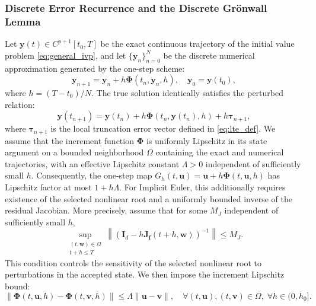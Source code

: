 \subsubsection{Discrete Error Recurrence and the Discrete Gr\"onwall Lemma}
Let $\mathbf{y}(t) \in C^{p+1}[t_0, T]$ be the exact continuous trajectory of the initial value problem \eqref{eq:general_ivp}, and let $\{\mathbf{y}_n\}_{n=0}^N$ be the discrete numerical approximation generated by the one-step scheme:
\begin{equation}
\label{eq:increment_form_convergence}
\mathbf{y}_{n+1} = \mathbf{y}_n + h \mathbf{\Phi}(t_n, \mathbf{y}_n, h), \quad \mathbf{y}_0 = \mathbf{y}(t_0),
\end{equation}
where $h = (T - t_0)/N$. The true solution identically satisfies the perturbed relation:
\begin{equation}
\label{eq:exact_perturbed_relation}
\mathbf{y}(t_{n+1}) = \mathbf{y}(t_n) + h \mathbf{\Phi}(t_n, \mathbf{y}(t_n), h) + h \boldsymbol{\tau}_{n+1},
\end{equation}
where $\boldsymbol{\tau}_{n+1}$ is the local truncation error vector defined in \eqref{eq:lte_def}. We assume that the increment function $\mathbf{\Phi}$ is uniformly Lipschitz in its state argument on a bounded neighborhood $\Omega$ containing the exact and numerical trajectories, with an effective Lipschitz constant $\Lambda>0$ independent of sufficiently small $h$. Consequently, the one-step map $G_h(t,\mathbf{u})=\mathbf{u}+h\mathbf{\Phi}(t,\mathbf{u},h)$ has Lipschitz factor at most $1+h\Lambda$. For Implicit Euler, this additionally requires existence of the selected nonlinear root and a uniformly bounded inverse of the residual Jacobian. More precisely, assume that for some $M_J$ independent of sufficiently small $h$,
\begin{equation}
\label{eq:uniform_residual_inverse}
\sup_{\substack{(t,\mathbf{w})\in\Omega\\ t+h\le T}}
\left\|
\left(\mathbf{I}_d-h\mathbf{J}_{\mathbf f}(t+h,\mathbf{w})\right)^{-1}
\right\|\le M_J.
\end{equation}
This condition controls the sensitivity of the selected nonlinear root to perturbations in the accepted state. We then impose the increment Lipschitz bound:
\begin{equation}
\label{eq:increment_lipschitz}
\|\mathbf{\Phi}(t, \mathbf{u}, h) - \mathbf{\Phi}(t, \mathbf{v}, h)\| \le \Lambda \|\mathbf{u} - \mathbf{v}\|, \quad \forall (t, \mathbf{u}), (t, \mathbf{v}) \in \Omega, \; \forall h \in (0, h_0].
\end{equation}
